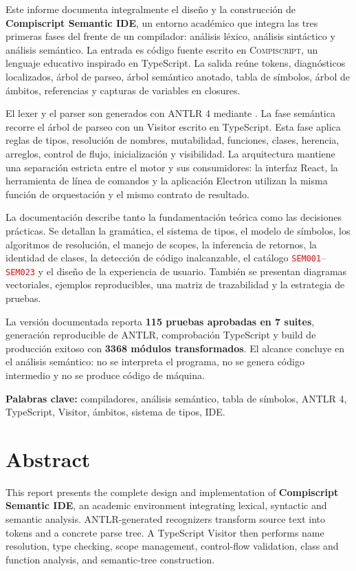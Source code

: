 \documentclass[11pt,letterpaper,oneside]{report}
\newcommand{\archivo}[1]{\path{#1}}
\newcommand{\diag}[1]{\textcolor{red}{\texttt{#1}}}
\newcommand{\Compiscript}{\textsc{Compiscript}}
\newcommand{\ANTLR}{ANTLR 4}
\begin{document}
Este informe documenta integralmente el diseño y la construcción de
\textbf{Compiscript Semantic IDE}, un entorno académico que integra las tres primeras
fases del frente de un compilador: análisis léxico, análisis sintáctico y análisis
semántico. La entrada es código fuente escrito en \Compiscript, un lenguaje educativo
inspirado en TypeScript. La salida reúne tokens, diagnósticos localizados, árbol de
parseo, árbol semántico anotado, tabla de símbolos, árbol de ámbitos, referencias y
capturas de variables en closures.

El lexer y el parser son generados con \ANTLR{} mediante \archivo{antlr4ts}. La fase
semántica recorre el árbol de parseo con un Visitor escrito en TypeScript. Esta fase
aplica reglas de tipos, resolución de nombres, mutabilidad, funciones, clases,
herencia, arreglos, control de flujo, inicialización y visibilidad. La arquitectura
mantiene una separación estricta entre el motor y sus consumidores: la interfaz
React, la herramienta de línea de comandos y la aplicación Electron utilizan la
misma función de orquestación y el mismo contrato de resultado.

La documentación describe tanto la fundamentación teórica como las decisiones
prácticas. Se detallan la gramática, el sistema de tipos, el modelo de símbolos, los
algoritmos de resolución, el manejo de scopes, la inferencia de retornos, la
identidad de clases, la detección de código inalcanzable, el catálogo
\diag{SEM001}--\diag{SEM023} y el diseño de la experiencia de usuario. También se
presentan diagramas vectoriales, ejemplos reproducibles, una matriz de trazabilidad y
la estrategia de pruebas.

La versión documentada reporta \textbf{115 pruebas aprobadas en 7 suites}, generación
reproducible de ANTLR, comprobación TypeScript y build de producción exitoso con
\textbf{3368 módulos transformados}. El
alcance concluye en el análisis semántico: no se interpreta el programa, no se genera
código intermedio y no se produce código de máquina.

\textbf{Palabras clave:} compiladores, análisis semántico, tabla de símbolos,
\ANTLR, TypeScript, Visitor, ámbitos, sistema de tipos, IDE.

\chapter*{Abstract}

This report presents the complete design and implementation of
\textbf{Compiscript Semantic IDE}, an academic environment integrating lexical,
syntactic and semantic analysis. ANTLR-generated recognizers transform source text
into tokens and a concrete parse tree. A TypeScript Visitor then performs name
resolution, type checking, scope management, control-flow validation, class and
function analysis, and semantic-tree construction.
\end{document}
